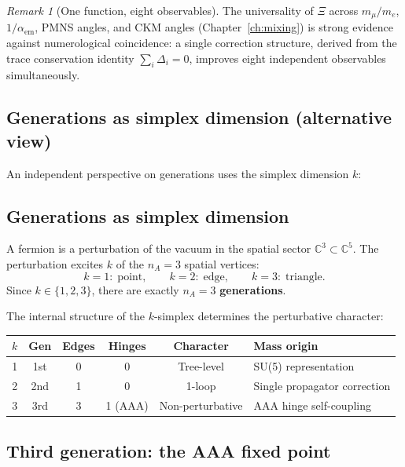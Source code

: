 \documentclass[12pt]{article}
\theoremstyle{remark}
\newtheorem{remark}[theorem]{Remark}
\theoremstyle{definition}
\newcommand{\CC}{\mathbb{C}}
\begin{document}
\begin{remark}[One function, eight observables]
The universality of $\Xi$ across $m_\mu/m_e$, $1/\alpha_\mathrm{em}$, PMNS angles, and CKM angles (Chapter~\ref{ch:mixing}) is strong evidence against numerological coincidence: a single correction structure, derived from the trace conservation identity $\sum_i \Delta_i = 0$, improves eight independent observables simultaneously.
\end{remark}

\subsection{Generations as simplex dimension (alternative view)}
\label{sec:gen_alt}

An independent perspective on generations uses the simplex dimension $k$:

\subsection{Generations as simplex dimension}

A fermion is a perturbation of the vacuum in the spatial sector $\CC^3 \subset \CC^5$. The perturbation excites $k$ of the $n_A = 3$ spatial vertices:
\begin{equation}
k = 1:\;\text{point}, \qquad k = 2:\;\text{edge}, \qquad k = 3:\;\text{triangle}.
\end{equation}
Since $k \in \{1, 2, 3\}$, there are exactly $n_A = 3$ \textbf{generations}.

The internal structure of the $k$-simplex determines the perturbative character:

\begin{center}
\begin{tabular}{cccccl}
\hline
$k$ & Gen & Edges & Hinges & Character & Mass origin \\
\hline
1 & 1st & 0 & 0 & Tree-level & SU(5) representation \\
2 & 2nd & 1 & 0 & 1-loop & Single propagator correction \\
3 & 3rd & 3 & 1 (AAA) & Non-perturbative & AAA hinge self-coupling \\
\hline
\end{tabular}
\end{center}

\subsection{Third generation: the AAA fixed point}
\end{document}
